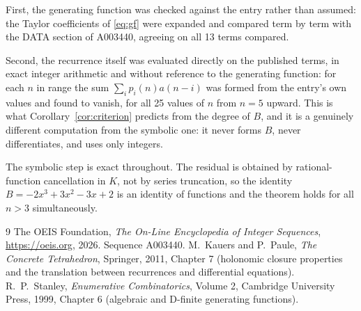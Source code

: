 \documentclass[11pt,a4paper]{article}
\theoremstyle{plain}
\theoremstyle{definition}
\begin{document}
First, the generating function was checked against the entry rather than assumed: the
Taylor coefficients of \eqref{eq:gf} were expanded and compared term by term with the DATA
section of A003440, agreeing on all 13 terms compared.

Second, the recurrence itself was evaluated directly on the published terms, in exact
integer arithmetic and without reference to the generating function: for each $n$ in range
the sum $\sum_{i}p_{i}(n)a(n-i)$ was formed from the entry's own values and found to
vanish, for all 25 values of $n$ from $n=5$ upward. This is what
Corollary~\ref{cor:criterion} predicts from the degree of $B$, and it is a genuinely
different computation from the symbolic one: it never forms $B$, never differentiates, and
uses only integers.

The symbolic step is exact throughout. The residual is obtained by rational-function
cancellation in $K$, not by series truncation, so the identity $B=- 2 x^{3} + 3 x^{2} - 3 x + 2$ is an
identity of functions and the theorem holds for all $n>3$ simultaneously.

\begin{thebibliography}{9}
 The OEIS Foundation, \emph{The On-Line Encyclopedia of Integer Sequences},
\url{https://oeis.org}, 2026. Sequence A003440.
 M.~Kauers and P.~Paule, \emph{The Concrete Tetrahedron}, Springer, 2011,
Chapter 7 (holonomic closure properties and the translation between recurrences and
differential equations).
 R.~P.~Stanley, \emph{Enumerative Combinatorics}, Volume 2, Cambridge
University Press, 1999, Chapter 6 (algebraic and D-finite generating functions).
\end{thebibliography}
\end{document}
